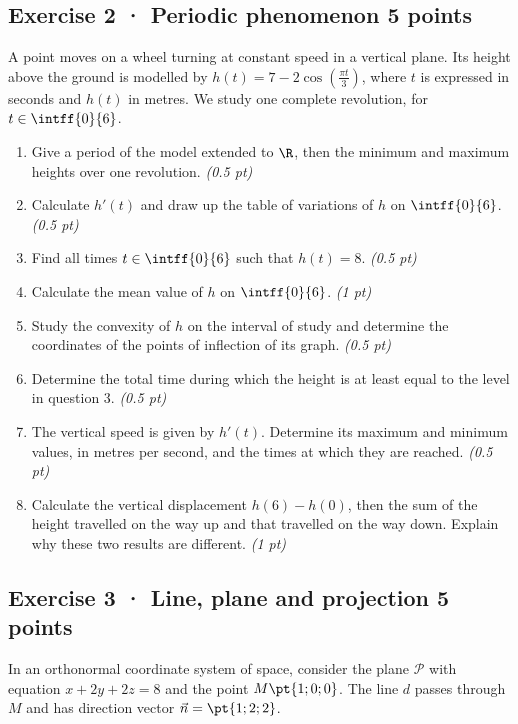 \subsection*{Exercise 2 · Periodic phenomenon \hfill 5 points}A point moves on a wheel turning at constant speed in a vertical plane. Its height above the ground is modelled by $h(t)=7-2\cos\left(\frac{\pi t}{3}\right)$, where $t$ is expressed in seconds and $h(t)$ in metres. We study one complete revolution, for $t\in\intff{0}{6}$.

\begin{enumerate}

\item Give a period of the model extended to $\R$, then the minimum and maximum heights over one revolution. \hfill\textit{(0.5 pt)}

\item Calculate $h'(t)$ and draw up the table of variations of $h$ on $\intff{0}{6}$. \hfill\textit{(0.5 pt)}

\item Find all times $t\in\intff{0}{6}$ such that $h(t)=8$. \hfill\textit{(0.5 pt)}

\item Calculate the mean value of $h$ on $\intff{0}{6}$. \hfill\textit{(1 pt)}

\item Study the convexity of $h$ on the interval of study and determine the coordinates of the points of inflection of its graph. \hfill\textit{(0.5 pt)}

\item Determine the total time during which the height is at least equal to the level in question 3. \hfill\textit{(0.5 pt)}

\item The vertical speed is given by $h'(t)$. Determine its maximum and minimum values, in metres per second, and the times at which they are reached. \hfill\textit{(0.5 pt)}

\item Calculate the vertical displacement $h(6)-h(0)$, then the sum of the height travelled on the way up and that travelled on the way down. Explain why these two results are different. \hfill\textit{(1 pt)}

\end{enumerate}

\mxnewpage{}

\subsection*{Exercise 3 · Line, plane and projection \hfill 5 points}In an orthonormal coordinate system of space, consider the plane $\mathcal P$ with equation $x+2y+2z=8$ and the point $M\pt{1;0;0}$. The line $d$ passes through $M$ and has direction vector $\vec n=\pt{1;2;2}$.

